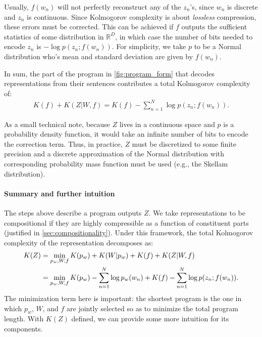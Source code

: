 \documentclass{article} %
\begin{document}
Usually, $f(w_n)$ will not perfectly reconstruct any of the $z_n$'s, since $w_n$ is discrete and $z_n$ is continuous. Since Kolmogorov complexity is about \emph{lossless} compression, these errors must be corrected. This can be achieved if $f$ outputs the sufficient statistics of some distribution in $\mathbb{R}^D$, in which case the number of bits needed to encode $z_n$ is $-\log p(z_n;f(w_n))$. For simplicity, we take $p$ to be a Normal distribution who's mean and standard deviation are given by $f(w_n)$.

In sum, the part of the program in \cref{fig:program_form} that decodes representations from their sentences contributes a total Kolmogorov complexity of:
\begin{align*}
        K(f) + K(Z|W,f) = K(f) - \sum_{n=1}^N \log p(z_n;f(w_n)) .
\end{align*}

As a small technical note, because $Z$ lives in a continuous space and $p$ is a probability density function, it would take an infinite number of bits to encode the correction term. Thus, in practice, $Z$ must be discretized to some finite precision and a discrete approximation of the Normal distribution with corresponding probability mass function must be used (e.g., the Skellam distribution).

\paragraph{Summary and further intuition}

The steps above describe a program outputs $Z$. We take representations to be compositional if they are highly compressible as a function of constituent parts (justified in \cref{sec:compositionality}). Under this framework, the total Kolmogorov complexity of the representation decomposes as:
\begin{align}
    \label{eq:K(Z)}
    K(Z) &= \min_{p_w,W,f} K(p_w) + K(W|p_w) + K(f) + K(Z|W,f) \\
            &= \min_{p_w,W,f} K(p_w) - \sum_{n=1}^N \log p_w(w_n) + K(f) - \sum_{n=1}^N \log p(z_n;f(w_n)) . \notag
\end{align}
The minimization term here is important: the shortest program is the one in which $p_w$, $W$, and $f$ are jointly selected so as to minimize the total program length. With $K(Z)$ defined, we can provide some more intuition for its components.
\end{document}
